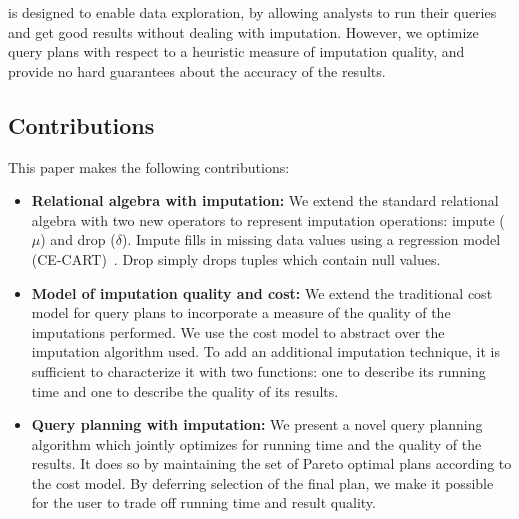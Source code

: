 \ProjectName{} is designed to enable data exploration, by allowing analysts to run their queries and get good results without dealing with imputation.
However, we optimize query plans with respect to a heuristic measure of imputation quality, and provide no hard guarantees about the accuracy of the results.

\subsection{Contributions}
This paper makes the following contributions:
\begin{itemize}
\item \textbf{Relational algebra with imputation:}
  We extend the standard relational algebra with two new operators to represent imputation operations: impute ($\mu$) and drop ($\delta$).
  Impute fills in missing data values using a regression model (CE-CART)~\cite{burgette2010multiple}.
  Drop simply drops tuples which contain null values.
\item \textbf{Model of imputation quality and cost:}
  We extend the traditional cost model for query plans to incorporate a measure of the quality of the imputations performed.
  We use the cost model to abstract over the imputation algorithm used.
  To add an additional imputation technique, it is sufficient to characterize it with two functions: one to describe its running time and one to describe the quality of its results.
\item \textbf{Query planning with imputation:}
  We present a novel query planning algorithm which jointly optimizes for running time and the quality of the results.
  It does so by maintaining the set of Pareto optimal plans according to the cost model.
  By deferring selection of the final plan, we make it possible for the user to trade off running time and result quality.
\end{itemize}




